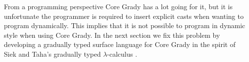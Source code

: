 From a programming perspective Core Grady has a lot going for it, but
it is unfortunate the programmer is required to insert explicit casts
when wanting to program dynamically.  This implies that it is not
possible to program in dynamic style when using Core Grady.  In the
next section we fix this problem by developing a gradually typed
surface language for Core Grady in the spirit of Siek and Taha's
gradually typed $\lambda$-calculus \cite{Siek:2006,Siek:2015}.

